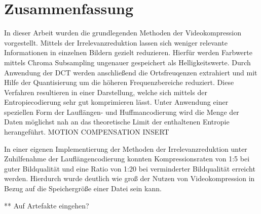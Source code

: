 \chapter{Zusammenfassung}
\label{kap:Zusammenfassung}

In dieser Arbeit wurden die grundlegenden Methoden der Videokompression vorgestellt. Mittels der Irrelevanzreduktion lassen sich weniger relevante Informationen in einzelnen Bildern gezielt reduzieren. Hierfür werden Farbwerte mittels Chroma Subsampling ungenauer gespeichert als Helligkeitswerte. Durch Anwendung der DCT werden anschließend die Ortsfreuqenzen extrahiert und mit Hilfe der Quantisierung um die höheren Frequenzbereiche reduziert. Diese Verfahren resultieren in einer Darstellung, welche sich mittels der Entropiecodierung sehr gut komprimieren lässt. Unter Anwendung einer speziellen Form der Lauflängen- und Huffmancodierung wird die Menge der Daten möglichst nah an das theoretische Limit der enthaltenen Entropie herangeführt. MOTION COMPENSATION INSERT

In einer eigenen Implementierung der Methoden der Irrelevanzreduktion unter Zuhilfenahme der Lauflängencodierung konnten Kompressionsraten von 1:5 bei guter Bildqualität und eine Ratio von 1:20 bei verminderter Bildqualität erreicht werden. Hierdurch wurde deutlich wie groß der Nutzen von Videokompression in Bezug auf die Speichergröße einer Datei sein kann.

** Auf Artefakte eingehen?
